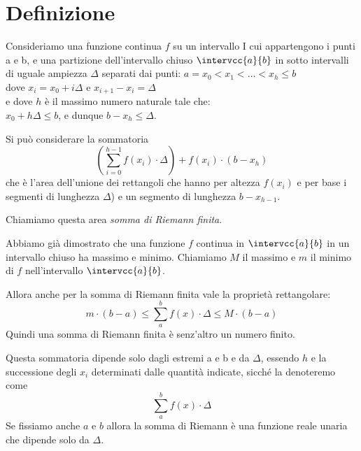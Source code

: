 \section{Definizione}
\label{sec:integrali_definizione}

\begin{minipage}{.39\textwidth}
\begin{inaccessibleblock} 
  \sommariemann
\end{inaccessibleblock}
\end{minipage}
\hfill
\begin{minipage}{.59\textwidth}
\begin{inaccessibleblock} 
Consideriamo una funzione continua \(f\) su un intervallo I cui 
appartengono i punti a e b, e una partizione dell'intervallo chiuso 
\(\intervcc{a}{b}\) in sotto intervalli di uguale ampiezza \(\Delta\) 
separati dai punti: 
\(a = x_0 < x_1 < \dots < x_h \le b\) \\
dove \(x_i = x_0 +i \Delta\) \quad e \quad \(x_{i+1} - x_i= \Delta\) \\
e dove \(h\) è il massimo numero naturale tale che: \\
\(x_0 + h \Delta \le b\), e dunque \(b-x_h \le \Delta\).
\end{inaccessibleblock}
\end{minipage}


Si può considerare la sommatoria
\[\left(\sum_{i=0}^{h-1} f(x_i)\cdot\Delta \right)+f(x_i)\cdot(b-x_h)\] 
che è l'area dell'unione dei rettangoli che 
hanno per altezza \(f(x_i)\) 
e per base i segmenti di lunghezza \(\Delta\)) e un segmento di lunghezza \(b 
- x_{h-1}\). 

Chiamiamo questa area \emph{somma di Riemann finita}.

Abbiamo già dimostrato che una funzione \(f\) continua in 
\(\intervcc{a}{b}\) in un intervallo chiuso ha massimo e minimo. 
Chiamiamo \(M\) il massimo e \(m\) il minimo di \(f\) nell'intervallo 
\(\intervcc{a}{b}\).

Allora anche per la somma di Riemann finita vale la proprietà rettangolare: 
\[m\cdot(b - a) \le \sum_a^b f(x) \cdot\Delta \le M\cdot(b - a)\] 
Quindi una somma di Riemann finita è senz'altro un numero finito.

Questa sommatoria dipende solo dagli estremi a e b 
e da \(\Delta\), essendo \(h\) e la successione degli \(x_i\) determinati 
dalle quantità indicate, sicché la denoteremo come 
\[\sum_a^b f(x) \cdot \Delta\] 
Se fissiamo anche \(a\) e \(b\) allora la somma di Riemann è una funzione 
reale unaria che dipende solo da \(\Delta\). 


